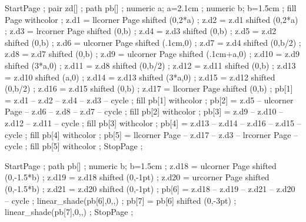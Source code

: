 
StartPage ;
pair zd[] ;
path pb[] ;
numeric a; a=2.1cm ;
numeric b; b=1.5cm ;
fill Page withcolor  ;
z.d1 = llcorner Page shifted (0,2*a) ;
z.d2 = z.d1 shifted (0,2*a) ;
z.d3 = lrcorner Page shifted (0,b) ;
z.d4 = z.d3 shifted (0,b) ;
z.d5 = z.d2 shifted (0,b) ;
z.d6 = ulcorner Page  shifted (.1cm,0) ;
z.d7 = z.d4 shifted (0,b/2) ;
z.d8 = z.d7 shifted (0,b) ;
z.d9 = ulcorner Page shifted (.1cm+a,0) ;
z.d10 = z.d9 shifted (3*a,0) ;
z.d11 = z.d8 shifted (0,b/2) ;
z.d12 = z.d11 shifted (0,b) ;
z.d13 = z.d10 shifted (a,0) ;
z.d14 = z.d13 shifted (3*a,0) ;
z.d15 = z.d12 shifted (0,b/2) ;
z.d16 = z.d15 shifted (0,b) ;
z.d17 = llcorner Page shifted (0,b) ;
pb[1] = z.d1 -- z.d2 -- z.d4 -- z.d3 -- cycle ;
fill pb[1] withcolor  ;
pb[2] = z.d5 -- ulcorner Page -- z.d6 -- z.d8 -- z.d7 -- cycle ;
fill pb[2] withcolor  ;
pb[3] = z.d9 -- z.d10 -- z.d12 -- z.d11 -- cycle ;
fill pb[3] withcolor  ;
pb[4] = z.d13 -- z.d14 -- z.d16 -- z.d15 -- cycle ;
fill pb[4] withcolor  ;
pb[5] = llcorner Page -- z.d17 -- z.d3 -- lrcorner Page -- cycle ;
fill pb[5] withcolor  ;
StopPage ;
\stopuniqueMPgraphic 

StartPage ;
path pb[] ;
numeric b; b=1.5cm ;
z.d18 = ulcorner Page shifted (0,-1.5*b) ;
z.d19 = z.d18 shifted (0,-1pt) ;
z.d20 = urcorner Page shifted (0,-1.5*b) ;
z.d21 = z.d20 shifted (0,-1pt) ;
pb[6] = z.d18 -- z.d19 -- z.d21 -- z.d20 -- cycle ;
linear_shade(pb[6],0,,) ;
pb[7] = pb[6] shifted (0,-3pt) ;
linear_shade(pb[7],0,,) ;
StopPage ;
\stopuniqueMPgraphic


 


